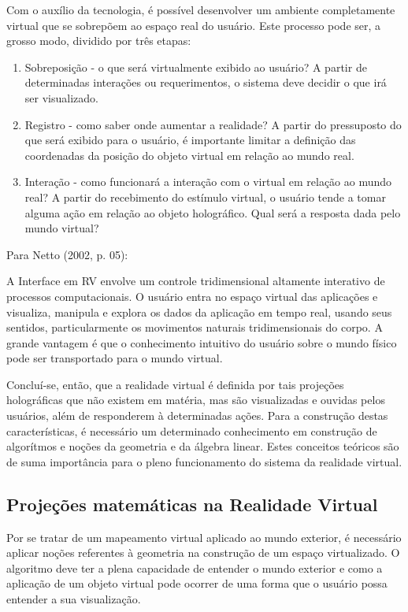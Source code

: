 \documentclass[a4paper, 12pt]{article}
\begin{document}
Com o auxílio da tecnologia, é possível desenvolver um ambiente completamente virtual que se sobrepõem ao espaço real do usuário. Este processo pode ser, a grosso modo, dividido por três etapas:
\begin{enumerate}
    \item Sobreposição - o que será virtualmente exibido ao usuário? A partir de determinadas interações ou requerimentos, o sistema deve decidir o que irá ser visualizado.
    \item Registro - como saber onde aumentar a realidade? A partir do pressuposto do que será exibido para o usuário, é importante limitar a definição das coordenadas da posição do objeto virtual em relação ao mundo real.
    \item Interação - como funcionará a interação com o virtual em relação ao mundo real? A partir do recebimento do estímulo virtual, o usuário tende a tomar alguma ação em relação ao objeto holográfico. Qual será a resposta dada pelo mundo virtual?
\end{enumerate}

Para Netto (2002, p. 05):

\begin{adjustwidth}{0.4\textwidth}{}
A Interface em RV envolve um controle tridimensional altamente interativo de processos computacionais. O usuário entra no espaço virtual das aplicações e visualiza, manipula e explora os dados da aplicação em tempo real, usando seus sentidos, particularmente os movimentos naturais tridimensionais do corpo. A grande vantagem é que o conhecimento intuitivo do usuário sobre o mundo físico pode ser transportado para o mundo virtual. \citep{netto2002}

\end{adjustwidth}

Concluí-se, então, que a realidade virtual é definida por tais projeções holográficas que não existem em matéria, mas são visualizadas e ouvidas pelos usuários, além de responderem à determinadas ações.
Para a construção destas características, é necessário um determinado conhecimento em construção de algorítmos e noções da geometria e da álgebra linear. Estes conceitos teóricos são de suma importância para o pleno funcionamento do sistema da realidade virtual. 
\subsection{Projeções matemáticas na Realidade Virtual}
Por se tratar de um mapeamento virtual aplicado ao mundo exterior, é necessário aplicar noções referentes à geometria na construção de um espaço virtualizado. O algoritmo deve ter a plena capacidade de entender o mundo exterior e como a aplicação de um objeto virtual pode ocorrer de uma forma que o usuário possa entender a sua visualização.
\end{document}
